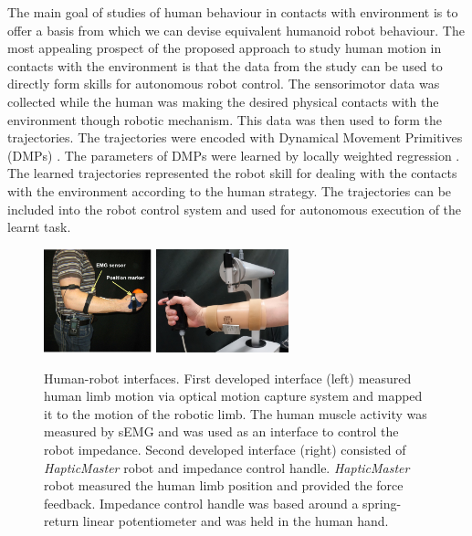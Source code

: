 \documentclass[final,5p,twocolumn]{elsarticle}
\begin{document}
The main goal of studies of human behaviour in contacts with environment is to offer a basis from which we can devise equivalent humanoid robot behaviour. The most appealing prospect of the proposed approach to study human motion in contacts with the environment is that the data from the study can be used to directly form skills for autonomous robot control. The sensorimotor data was collected while the human was making the desired physical contacts with the environment though robotic mechanism. This data was then used to form the trajectories. The trajectories were encoded with Dynamical Movement Primitives (DMPs) \cite{Ijspeert2002}. The parameters of DMPs were learned by locally weighted regression \cite{Schaal1998}. The learned trajectories represented the robot skill for dealing with the contacts with the environment according to the human strategy. The trajectories can be included into the robot control system and used for autonomous execution of the learnt task.
\begin{figure}[!t]
\centering
\includegraphics[height=3cm]{images/emg_setup.pdf}
\includegraphics[height=3cm]{images/haptic.pdf}
\caption{Human-robot interfaces. First developed interface (left) measured human limb motion via optical motion capture system and mapped it to the motion of the robotic limb. The human muscle activity was measured by sEMG and was used as an interface to control the robot impedance. Second developed interface (right) consisted of \textit{HapticMaster} robot and impedance control handle. \textit{HapticMaster} robot measured the human limb position and provided the force feedback. Impedance control handle was based around a spring-return linear potentiometer and was held in the human hand.}
\label{fig:interface}
\end{figure}
\end{document}
